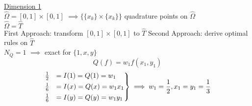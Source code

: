 \underline{Dimension 1}\\
$\hat{\Omega} = [0,1]\times [0,1]$ $\implies \{\{x_k\}\times\{x_k\} \}$ quadrature points on $\hat{\Omega}$\\
$\hat{\Omega} = \hat{T}$\\
First Approach: transform $[0,1]\times [0,1]$ to $\hat{T}$
Second Approach: derive optimal rules on $\hat{T}$\\
$N_Q = 1$ $\implies$ exact for $\{1,x,y\}$
\begin{equation*}
Q(f)= w_1f(x_1,y_1)
\end{equation*}
\begin{align*}
\begin{rcases}
\frac{1}{2}&= I(1)= Q(1) = w_1  \\
\frac{1}{6}&= I(x)= Q(x) = w_1x_1  \\
\frac{1}{6}&= I(y)= Q(y) = w_1y_1\\
\end{rcases} \implies w_1= \frac{1}{2}, x_1=y_1 = \frac{1}{3}
\end{align*}